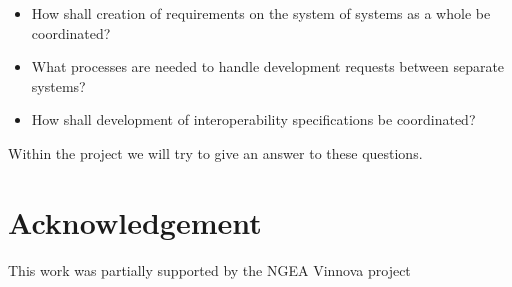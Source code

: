 \documentclass{llncs}
\begin{document}
\begin{itemize}
\item How shall creation of requirements on the system of systems as a whole be coordinated? 
\item What processes are needed to handle development requests between separate systems? 
\item How shall development of interoperability specifications be coordinated? 
\end{itemize}

Within the project we will try to give an answer to these questions.


\section*{Acknowledgement}
This work was partially supported by the NGEA Vinnova
project 


	

\clearpage
% 
\end{document}
